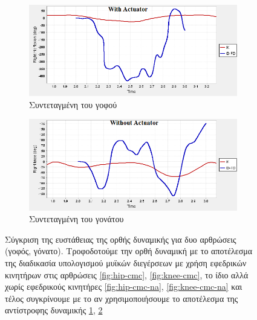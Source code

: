 \begin{figure}[H]
    \centering
    \begin{subfigure}[t]{.48\textwidth}
        \includegraphics[width=\textwidth, keepaspectratio]{fig/hip-ik-id.png}
        \caption{Συντεταγμένη του γοφού}
        \label{fig:hip-id}
    \end{subfigure}
    \begin{subfigure}[t]{.48\textwidth}
        \includegraphics[width=\textwidth, keepaspectratio]{fig/knee-ik-id.png}
        \caption{Συντεταγμένη του γονάτου}
        \label{fig:knee-id}
    \end{subfigure}
    \caption{Σύγκριση της ευστάθειας της ορθής δυναμικής για δυο αρθρώσεις (γοφός, γόνατο). Τροφοδοτούμε την ορθή δυναμική με το αποτέλεσμα της διαδικασία υπολογισμού μυϊκών διεγέρσεων με χρήση εφεδρικών κινητήρων στις αρθρώσεις \ref{fig:hip-cmc}, \ref{fig:knee-cmc}, το ίδιο αλλά χωρίς εφεδρικούς κινητήρες \ref{fig:hip-cmc-na}, \ref{fig:knee-cmc-na} και τέλος συγκρίνουμε με το αν χρησιμοποιήσουμε το αποτέλεσμα της αντίστροφης δυναμικής \ref{fig:hip-id}, \ref{fig:knee-id}}
    \label{fig:fd-cmc-id}
\end{figure}

